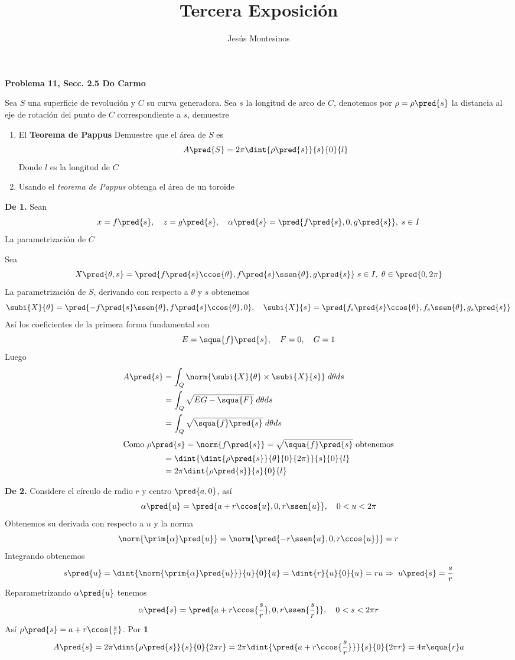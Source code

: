 \documentclass[letterpaper, 12pt]{article}
\title{Tercera Exposición}
\author{Jesús Montesinos}
\begin{document}
\maketitle
{\bf Problema 11, Secc. 2.5 Do Carmo }

\noindent Sea $S$ una superficie de revolución y $C$ su curva generadora. Sea $s$ la longitud de arco de $C$, denotemos por $\rho=\rho\pred{s}$ la distancia al eje de rotación del punto de $C$ correspondiente a $s$, demuestre
\begin{enumerate}
    \item El {\bf Teorema de Pappus} Demuestre que el área de $S$ es \[A\pred{S}=2\pi\dint{\rho\pred{s}}{s}{0}{l}\] Donde $l$ es la longitud de $C$
    \item Usando el {\it teorema de Pappus} obtenga el área de un toroide
\end{enumerate}
\begin{Sol}
    {\bf De 1.} Sean \[x=f\pred{s},\quad z=g\pred{s},\quad \alpha\pred{s}=\pred{f\pred{s},0,g\pred{s}},\; s\in I\] La parametrización de $C$

    Sea \[X\pred{\theta, s}=\pred{f\pred{s}\ccos{\theta},f\pred{s}\ssen{\theta},g\pred{s}}\; s\in I,\; \theta\in\pred{0,2\pi}\] La parametrización de $S$, derivando con respecto a $\theta$ y $s$ obtenemos \[\subi{X}{\theta}=\pred{-f\pred{s}\ssen{\theta},f\pred{s}\ccos{\theta},0},\quad \subi{X}{s}=\pred{{f}_{s}\pred{s}\ccos{\theta},{f}_{s}\ssen{\theta},{g}_{s}\pred{s}}\] Así los coeficientes de la primera forma fundamental son \[E=\squa{f}\pred{s},\quad F=0,\quad G=1\] Luego
    \begin{align*}
        A\pred{s} & =\int_{Q}\norm{\subi{X}{\theta}\times\subi{X}{s}}\; d\theta ds \\
                  & =\int_{Q}\sqrt{EG-\squa{F}}\; d\theta ds                       \\
                  & =\int_{Q}\sqrt{\squa{f}\pred{s}}\; d\theta ds                  \\
        \intertext{Como $\rho\pred{s}=\norm{f\pred{s}}=\sqrt{\squa{f}\pred{s}}$ obtenemos}
                  & =\dint{\dint{\rho\pred{s}}{\theta}{0}{2\pi}}{s}{0}{l}          \\
                  & =2\pi\dint{\rho\pred{s}}{s}{0}{l}
    \end{align*}
\end{Sol}

\newpage

\begin{Sol}
    {\bf De 2.} Considere el círculo de radio $r$ y centro $\pred{a,0}$, así \[\alpha\pred{u}=\pred{a+r\ccos{u},0,r\ssen{u}},\quad 0<u<2\pi\] Obtenemos su derivada con respecto a $u$ y la norma \[\norm{\prim{\alpha}\pred{u}}=\norm{\pred{-r\ssen{u},0,r\ccos{u}}}=r\] Integrando obtenemos \[s\pred{u}=\dint{\norm{\prim{\alpha}\pred{u}}}{u}{0}{u}=\dint{r}{u}{0}{u}=ru\Rightarrow\; u\pred{s}=\frac{s}{r}\]
    Reparametrizando $\alpha\pred{u}$ tenemos \[\alpha\pred{s}=\pred{a+r\ccos{\frac{s}{r}},0,r\ssen{\frac{s}{r}}},\quad 0<s<2\pi r\] Así $\rho\pred{s}=a+r\ccos{\frac{s}{r}}$. Por {\bf 1}
    \[ A\pred{s}=2\pi\dint{\rho\pred{s}}{s}{0}{2\pi r}=2\pi\dint{\pred{a+r\ccos{\frac{s}{r}}}}{s}{0}{2\pi r}=4\pi\squa{r}a\]
\end{Sol}
\end{document}
